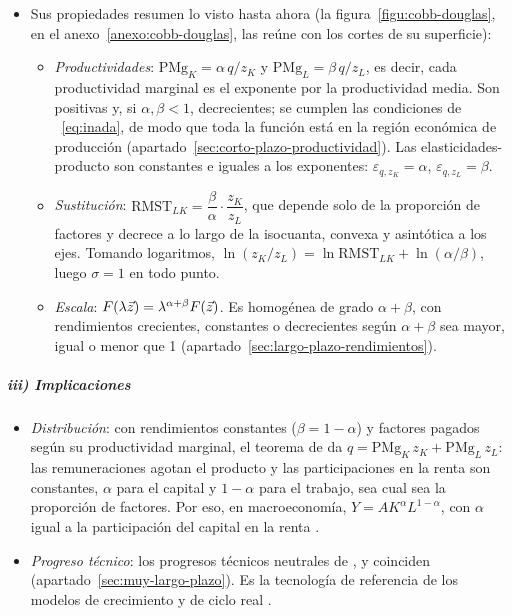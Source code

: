 \documentclass[11pt]{article}
\begin{document}
\begin{itemize}
\item Sus propiedades resumen lo visto hasta ahora (la figura~\ref{figu:cobb-douglas}, en el anexo~\ref{anexo:cobb-douglas}, las reúne con los cortes de su superficie):
  \begin{itemize}
  \item \emph{Productividades}: $\mathrm{PMg}_K=\alpha\,q/z_K$ y $\mathrm{PMg}_L=\beta\,q/z_L$, es decir, cada productividad marginal es el exponente por la productividad media. Son positivas y, si $\alpha,\beta<1$, decrecientes; se cumplen las condiciones de ~\eqref{eq:inada}, de modo que toda la función está en la región económica de producción (apartado~\ref{sec:corto-plazo-productividad}). Las elasticidades-producto son constantes e iguales a los exponentes: $\varepsilon_{q,z_K}=\alpha$, $\varepsilon_{q,z_L}=\beta$.
  \item \emph{Sustitución}: $\mathrm{RMST}_{LK}=\dfrac{\beta}{\alpha}\cdot\dfrac{z_K}{z_L}$, que depende solo de la proporción de factores y decrece a lo largo de la isocuanta, convexa y asintótica a los ejes. Tomando logaritmos, $\ln(z_K/z_L)=\ln \mathrm{RMST}_{LK}+\ln(\alpha/\beta)$, luego $\sigma=1$ en todo punto.
  \item \emph{Escala}: $F(\lambda\vec{z})=\lambda^{\alpha+\beta}F(\vec{z})$. Es homogénea de grado $\alpha+\beta$, con rendimientos crecientes, constantes o decrecientes según $\alpha+\beta$ sea mayor, igual o menor que 1 (apartado~\ref{sec:largo-plazo-rendimientos}).
  \end{itemize}
\end{itemize}

\subparagraph{iii) Implicaciones}

\begin{itemize}
\item \emph{Distribución}: con rendimientos constantes ($\beta=1-\alpha$) y factores pagados según su productividad marginal, el teorema de  da $q=\mathrm{PMg}_K\,z_K+\mathrm{PMg}_L\,z_L$: las remuneraciones agotan el producto y las participaciones en la renta son constantes, $\alpha$ para el capital y $1-\alpha$ para el trabajo, sea cual sea la proporción de factores. Por eso, en macroeconomía, $Y=AK^{\alpha}L^{1-\alpha}$, con $\alpha$ igual a la participación del capital en la renta  .
\item \emph{Progreso técnico}: los progresos técnicos neutrales de ,  y  coinciden (apartado~\ref{sec:muy-largo-plazo}). Es la tecnología de referencia de los modelos de crecimiento  y de ciclo real .
\end{itemize}
\end{document}
